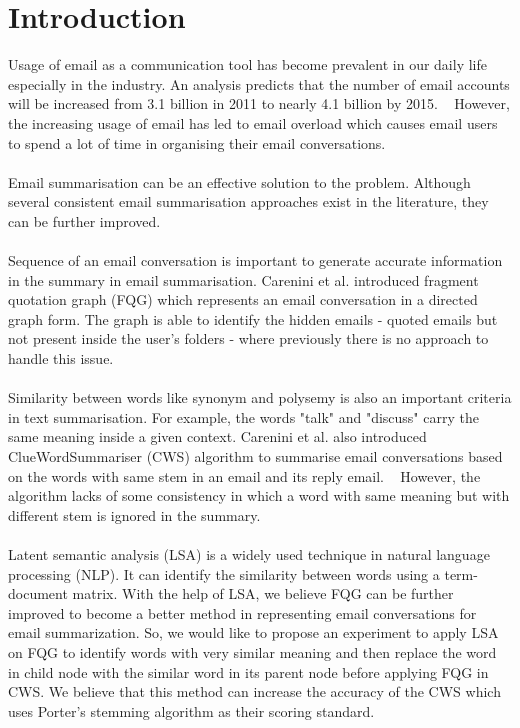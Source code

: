 \documentclass[a4paper, 12pt]{article}
\begin{document}
\section*{Introduction}
Usage of email as a communication tool has become prevalent in our daily life especially in the industry. An analysis predicts that the number of email accounts will be increased from 3.1 billion in 2011 to nearly 4.1 billion by 2015. ~\cite{radicati2011} However, the increasing usage of email has led to email overload which causes email users to spend a lot of time in organising their email conversations. 
\\ \\
Email summarisation can be an effective solution to the problem. Although several consistent email summarisation approaches exist in the literature, they can be further improved.
\\ \\
Sequence of an email conversation is important to generate accurate information in the summary in email summarisation. Carenini et al. introduced fragment quotation graph (FQG) which represents an email conversation in a directed graph form. The graph is able to identify the hidden emails - quoted emails but not present inside the user’s folders - where previously there is no approach to handle this issue.~\cite{Carenini2005}
\\ \\
Similarity between words like synonym and polysemy is also an important criteria in text summarisation. For example, the words "talk" and "discuss" carry the same meaning inside a given context.  Carenini et al. also introduced ClueWordSummariser (CWS) algorithm to summarise email conversations based on the words with same stem in an email and its reply email. ~\cite{Carenini2007} However, the algorithm lacks of some consistency in which a word with same meaning but with different stem is ignored in the summary.
\\ \\
Latent semantic analysis (LSA) is a widely used technique in natural language processing (NLP). It can identify the similarity between words using a term-document matrix. With the help of LSA, we believe FQG can be further improved to become a better method in representing email conversations for email summarization. So, we would like to propose an experiment to apply LSA on FQG to identify words with very similar meaning and then replace the word in child node with the similar word in its parent node before applying FQG in CWS. We believe that this method can increase the accuracy of the CWS which uses Porter’s stemming algorithm as their scoring standard. 
\end{document}
